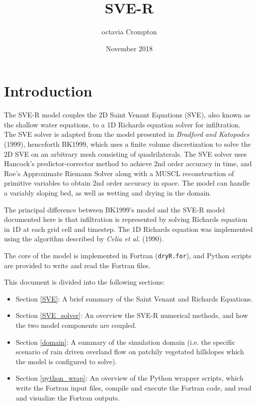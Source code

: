 \documentclass{article}
\title{SVE-R}
\author{octavia Crompton}
\date{November 2018}
\newcommand{\code}[1]{\texttt{#1}}
\begin{document}
\tableofcontents		

\section{Introduction}

The SVE-R model couples the 2D Saint Venant Equations (SVE), also known as the shallow water equations, to a 1D Richards equation solver for infiltration.  The SVE solver is adapted from the model presented in \textit{Bradford and Katopodes} (1999), henceforth BK1999, which uses a finite volume discretization to solve the 2D SVE on an arbitrary mesh consisting of quadrilaterals.   The SVE solver uses Hancock's predictor-corrector method  to achieve 2nd order accuracy in time, and Roe's Approximate Riemann Solver along with a MUSCL reconstruction of primitive variables to obtain 2nd order accuracy in space.   The model can handle a variably sloping bed, as well as wetting and drying in the domain.

The principal difference between  BK1999's model and the SVE-R model documented here is that infiltration is represented by solving Richards equation in 1D at each grid cell and timestep.  The 1D Richards equation was implemented using the algorithm described by  \textit{Celia et al.} (1990).  


The core of the model is implemented in Fortran  (\code{dryR.for}), and Python scripts are provided to write and read the Fortran files.
  
This document is divided into the following sections:

\begin{itemize}
	\item Section \ref{SVE}: A brief summary of the Saint Venant and Richards Equations.
	\item Section \ref{SVE_solver}:  An overview the SVE-R numerical methods, and how the two model components are coupled. 
	\item Section \ref{domain}: A summary of the simulation domain (i.e. the specific scenario of rain driven overland flow on patchily vegetated hillslopes which the model is configured to solve).
	\item   Section \ref{python_wrap}: An overview of the Python wrapper scripts,  which write the Fortran input files, compile and execute the Fortran code, and read and visualize the Fortran outputs. 
\end{itemize}		
\end{document}
